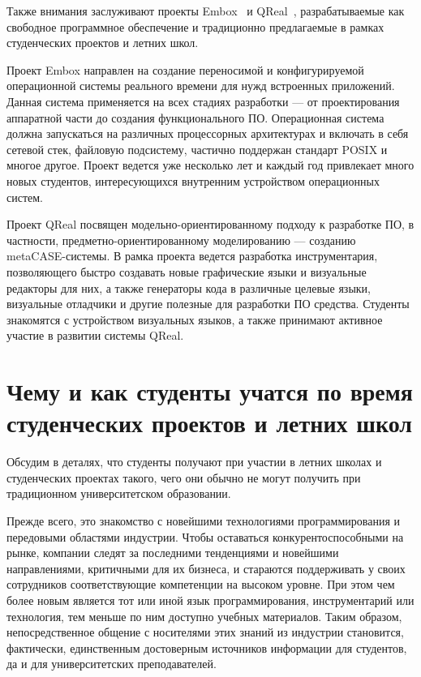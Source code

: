 \documentclass[a4paper]{article}
\begin{document}
Также внимания заслуживают проекты Embox~\cite{embox} и QReal~\cite{qreal2, qreal3, qreal}, разрабатываемые как свободное программное обеспечение и традиционно предлагаемые в рамках студенческих проектов и летних школ. 

Проект Embox направлен на создание переносимой  и конфигурируемой операционной системы реального времени для нужд встроенных приложений. Данная система применяется на всех стадиях разработки --- от проектирования аппаратной части до создания функционального ПО. Операционная система  должна запускаться на различных процессорных архитектурах и включать в себя сетевой стек, файловую подсистему, частично поддержан стандарт POSIX и многое другое. Проект ведется уже несколько лет и каждый год привлекает много новых студентов, интересующихся внутренним устройством операционных систем.  

Проект QReal посвящен модельно-ориентированному подходу к разработке ПО, в частности, предметно-ориентированному моделированию --- созданию metaCASE-системы. В рамка проекта ведется разработка инструментария, позволяющего быстро создавать новые графические языки и визуальные редакторы для них, а также генераторы кода в различные целевые языки, визуальные отладчики и другие полезные для разработки ПО средства. Студенты знакомятся с устройством визуальных языков, а также принимают активное участие в развитии системы QReal.

\section{Чему и как студенты учатся по время студенческих проектов и летних школ}

Обсудим в деталях, что студенты получают при участии в летних школах и студенческих проектах такого, чего они обычно не могут получить при традиционном университетском образовании.

Прежде всего, это знакомство с новейшими технологиями программирования и передовыми областями индустрии. Чтобы оставаться конкурентоспособными на рынке, компании следят за последними тенденциями и новейшими направлениями, критичными для их бизнеса, и стараются поддерживать у своих сотрудников соответствующие компетенции на высоком уровне. При этом чем более новым является тот или иной язык программирования, инструментарий или технология, тем меньше по ним доступно учебных материалов. Таким образом, непосредственное общение с носителями этих знаний из индустрии становится, фактически, единственным достоверным источников информации для студентов, да и для университетских преподавателей.  
\end{document}
